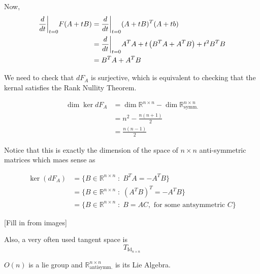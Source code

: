 \documentclass{article}
\newcommand{\R}{\mathbb{R}}
\newcommand{\restr}[2]{{%
  \left.\kern-\nulldelimiterspace %
  #1 %
  \vphantom{\big|} %
  \right|_{#2} %
  }}
\begin{document}
Now, 
\begin{align*}
  \restr{\frac{d}{dt}}{t = 0} F(A + tB) &= \restr{\frac{d}{dt}}{t = 0} (A + tB)^T (A + tb) \\
  &= \restr{\frac{d}{dt}}{t = 0} A^T A + t\left( B^T A + A^T B \right) + t^2 B^T B \\
  &= B^T A + A^T B
\end{align*}

We need to check that $dF_A$ is surjective, which is equivalent to checking that the kernal satisfies the Rank Nullity Theorem.

\begin{align*}
  \dim \ker dF_A &=\dim \R^{n \times n} - \dim \R^{n \times n}_{\text{symm.}} \\
  &= n^2 - \frac{n(n+1)}{2} \\
  &= \frac{n(n-1)}{2}
\end{align*}

Notice that this is exactly the dimension of the space of $n \times n$ anti-symmetric matrices which maes sense as 

\begin{align*}
  \ker (dF_A) &= \{  B \in \R^{n \times n} \;:\; B^T A = -A^T B \} \\
  &= \{  B \in \R^{n \times n} \;:\; \left(A^T B\right)^T = -A^T B \} \\
  &= \{ B \in \R^{n \times n} \;:\; B = A C, \text{ for some antsymmetric }C \}
\end{align*}

\vskip 0.5cm
[Fill in from images]

\vskip 0.5cm
Also, a very often used tangent space is 
\[ T_{{\text{Id}_{n \times n}}} \]

$O(n)$ is a lie group and $\R^{n \times n}_{\text{antisymm.}}$ is its Lie Algebra.
\end{document}
